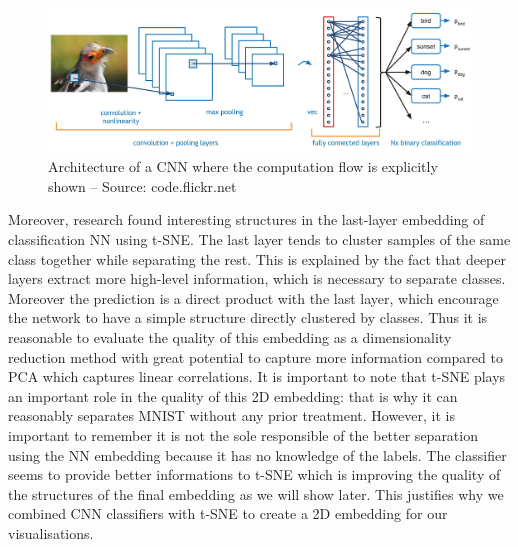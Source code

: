 \documentclass[a4paper,12pt]{report}
\begin{document}
\begin{figure}[t]
    \begin{center}
        \includegraphics[width=\textwidth]{thesis_figures/conv-net2.jpg}
    \end{center}
    \caption{Architecture of a CNN where the computation flow is explicitly shown -- Source: code.flickr.net}
    \label{fig:convnet}
\end{figure}

Moreover, research found interesting structures in the last-layer embedding of classification NN using t-SNE.
The last layer tends to cluster samples of the same class together while separating the rest\cite{donahue2013decaf}\cite{yu2014visualizing}.
This is explained by the fact that deeper layers extract more high-level information, which is necessary to separate classes. Moreover the prediction is a direct product with the last layer, which encourage the network to have a simple structure directly clustered by classes.
Thus it is reasonable to evaluate the quality of this embedding as a dimensionality reduction method with great potential to capture more information compared to PCA which captures linear correlations.
It is important to note that t-SNE plays an important role in the quality of this 2D embedding: that is why it can reasonably separates MNIST without any prior treatment.
However, it is important to remember it is not the sole responsible of the better separation using the NN embedding because it has no knowledge of the labels.
The classifier seems to provide better informations to t-SNE which is improving the quality of the structures of the final embedding as we will show later.
This justifies why we combined CNN classifiers with t-SNE to create a 2D embedding for our visualisations.


\end{document}
